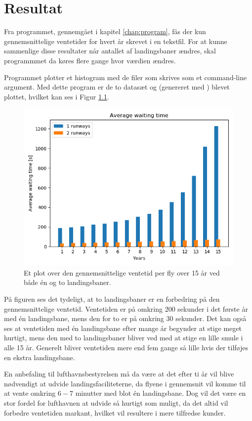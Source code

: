 \chapter{Resultat}
Fra programmet, gennemgået i kapitel \ref{chap:program}, fås der kun gennemsnittelige ventetider for hvert år skrevet i en tekstfil.
For at kunne sammenlige disse resultater når antallet af landingsbaner ændres, skal programmmet da køres flere gange hvor værdien  ændres.

Programmet  plotter et histogram med de filer som skrives som et command-line argument.
Med dette program er de to datasæt  og  (genereret med ) blevet plottet, hvilket kan ses i Figur \ref{fig:results}.

\begin{figure}[h]
	\centering
	\includegraphics[scale=0.7]{fig/img/results_15Y.png}
	\caption{Et plot over den gennemsnittelige ventetid per fly over 15 år ved både én og to landingsbaner.} \label{fig:results}
\end{figure}

På figuren ses det tydeligt, at to landingsbaner er en forbedring på den gennemsnittelige ventetid.
Ventetiden er på omkring 200 sekunder i det første år med én landingsbane, mens den for to er på omkring 30 sekunder.
Det kan også ses at ventetiden med én landingsbane efter mange år begynder at stige meget hurtigt, mens den med to landingsbaner bliver ved med at stige en lille smule i alle 15 år.
Generelt bliver ventetiden mere end fem gange så lille hvis der tilføjes en ekstra landingsbane.

En anbefaling til lufthavnsbestyrelsen må da være at det efter ti år vil blive nødvendigt at udvide landingsfaciliteterne, da flyene i gennemsnit vil komme til at vente omkring $6-7$ minutter med blot én landingsbane.
Dog vil det være en stor fordel for lufthavnen at udvide så hurtigt som muligt, da det altid vil forbedre ventetiden markant, hvilket vil resultere i mere tilfredse kunder.
